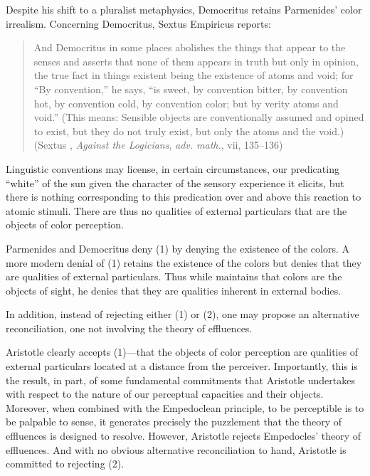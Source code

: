 Despite his shift to a pluralist metaphysics, Democritus retains Parmenides' color irrealism. Concerning Democritus, Sextus Empiricus reports:
\begin{quote}
	And Democritus in some places abolishes the things that appear to the senses and asserts that none of them appears in truth but only in opinion, the true fact in things existent being the existence of atoms and void; for ``By convention,'' he says, ``is sweet, by convention bitter, by convention hot, by convention cold, by convention color; but by verity atoms and void.'' (This means: Sensible objects are conventionally assumed and opined to exist, but they do not truly exist, but only the atoms and the void.) (Sextus \citeauthor{Empiricus:1997kx}, \emph{Against the Logicians}, \emph{adv. math.}, vii, 135--136) 
\end{quote}
Linguistic conventions may license, in certain circumstances, our predicating ``white'' of the sun given the character of the sensory experience it elicits, but there is nothing corresponding to this predication over and above this reaction to atomic stimuli. There are thus no qualities of external particulars that are the objects of color perception. 

Parmenides and Democritus deny (1) by denying the existence of the colors. A more modern denial of (1) retains the existence of the colors but denies that they are qualities of external particulars. Thus while \citet{Berkeley:1734fk} maintains that colors are the objects of sight, he denies that they are qualities inherent in external bodies. 

In addition, instead of rejecting either (1) or (2), one may propose an alternative reconciliation, one not involving the theory of effluences. 

Aristotle clearly accepts (1)---that the objects of color perception are qualities of external particulars located at a distance from the perceiver. Importantly, this is the result, in part, of some fundamental commitments that Aristotle undertakes with respect to the nature of our perceptual capacities and their objects. Moreover, when combined with the Empedoclean principle, to be perceptible is to be palpable to sense, it generates precisely the puzzlement that the theory of effluences is designed to resolve. However, Aristotle rejects Empedocles' theory of effluences. And with no obvious alternative reconciliation to hand, Aristotle is committed to rejecting (2). 

